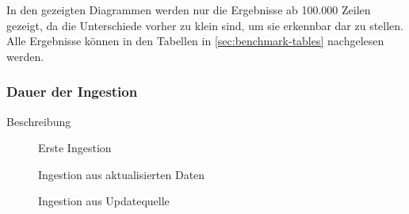In den gezeigten Diagrammen werden nur die Ergebnisse ab 100.000 Zeilen gezeigt, da die Unterschiede vorher zu klein sind, um sie erkennbar dar zu stellen.
Alle Ergebnisse können in den Tabellen in \cref{sec:benchmark-tables} nachgelesen werden.


\subsubsection{Dauer der Ingestion}
Beschreibung
\begin{figure}
    \centering
    \label{fig:eval-time-c}
    \caption{Erste Ingestion}
\end{figure}

\begin{figure}
    \centering
    \label{fig:eval-time-c}
    \caption{Ingestion aus aktualisierten Daten}
\end{figure}

\begin{figure}
    \centering
    \label{fig:eval-time-c}
    \caption{Ingestion aus Updatequelle}
\end{figure}
